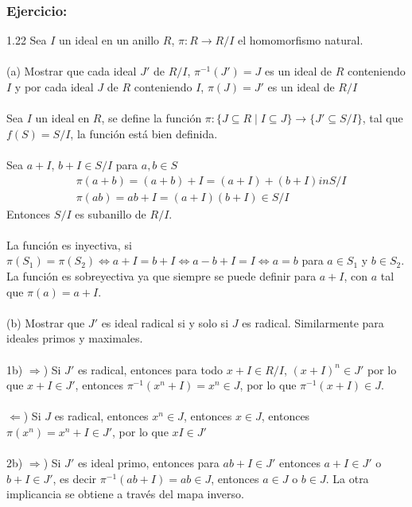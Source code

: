 \documentclass{article}
\begin{document}
\subsubsection*{Ejercicio:}
1.22 Sea $I$ un ideal en un anillo $R$, $\pi: R \to R/I$ el homomorfismo natural. 
\\
\\
(a) Mostrar que cada ideal $J'$ de $R/I$, $\pi^{-1}(J')=J$ es un ideal de $R$ conteniendo $I$ y por cada ideal $J$ de $R$ conteniendo $I$, $\pi(J)=J'$ es un ideal de $R/I$
\\
\\
Sea $I$ un ideal en $R$, se define la función $\pi: \{J \subseteq R \mid I \subseteq J \} \to \{J' \subseteq S/I \}$, tal que $f(S)=S/I$, la función está bien definida.
\\
\\
Sea $a+I$, $b+I \in S/I$ para $a,b \in S$
\begin{equation*}
\begin{aligned}
    &\pi(a+b)=(a+b)+I=(a+I)+(b+I) in S/I \\
    &\pi(ab)=ab+I = (a+I)(b+I) \in S/I
\end{aligned}
\end{equation*}
Entonces $S/I$ es subanillo de $R/I$.
\\
\\
La función es inyectiva, si $\pi(S_1) = \pi(S_2) \Longleftrightarrow a + I = b + I \Longleftrightarrow a - b + I = I \Longleftrightarrow a = b$ para $a \in S_1$ y $b \in S_2$. La función es sobreyectiva ya que siempre se puede definir para $a + I$, con $a$ tal que $\pi(a) = a + I$.
\\
\\
(b) Mostrar que $J'$ es ideal radical si y solo si $J$ es radical. Similarmente para ideales primos y maximales.
\\
\\
1b) $\Longrightarrow$) Si $J'$ es radical, entonces para todo $x+I \in R/I$, $(x+I)^n \in J'$ por lo que $x+I \in J'$, entonces $\pi^{-1}(x^n +I)=x^n \in J$, por lo que $\pi^{-1}(x+I) \in J$.
\\
\\
$\Longleftarrow$) Si $J$ es radical, entonces $x^n \in J$, entonces $x \in J$, entonces $\pi(x^n)=x^n +I \in J'$, por lo que $x 
I \in J'$
\\
\\
2b) $\Longrightarrow$) Si $J'$ es ideal primo, entonces para $ab+I \in J'$ entonces $a+I \in J'$ o $b+I \in J'$, es decir $\pi^{-1}(ab+I)=ab \in J$, entonces $a \in J$ o $b \in J$. La otra implicancia se obtiene a través del mapa inverso.
\end{document}
